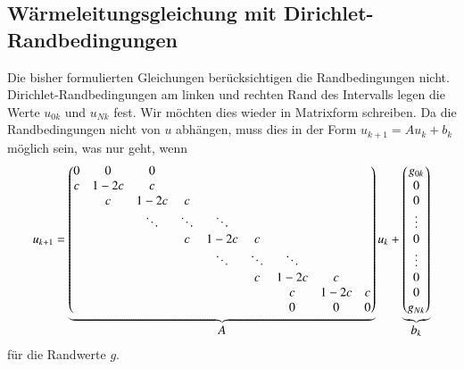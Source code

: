 \subsection{Wärmeleitungsgleichung mit Dirichlet-Randbedingungen
\label{buch:pde:subsection:waerme:dirichlet}}
Die bisher formulierten Gleichungen berücksichtigen die
Randbedingungen nicht.
Dirichlet-Rand\-bedingungen am linken und rechten Rand des Intervalls
legen die Werte $u_{0k}$ und $u_{Nk}$ fest.
Wir möchten dies wieder in Matrixform schreiben.
Da die Randbedingungen nicht von $u$ abhängen, muss dies in der Form
$u_{k+1}=Au_k + b_k$ möglich sein, was nur geht, wenn
\begin{equation}
u_{k+1}
=
\underbrace{
\begin{pmatrix}
 0  &   0  &  0   &      &      &      &      &      &      \\
 c  & 1-2c &  c   &      &      &      &      &      &      \\
    &  c   & 1-2c &  c   &      &      &      &      &      \\
    &      &\ddots&\ddots&\ddots&      &      &      &      \\
    &      &      &  c   & 1-2c &  c   &      &      &      \\
    &      &      &      &\ddots&\ddots&\ddots&      &      \\
    &      &      &      &      &  c   & 1-2c &  c   &      \\
    &      &      &      &      &      &  c   & 1-2c &  c   \\
    &      &      &      &      &      &  0   &  0   &  0   
\end{pmatrix}}_{\displaystyle A\mathstrut}
u_k
+
\underbrace{
\begin{pmatrix}
g_{0k}\\
0     \\
0     \\
\vdots\\
0     \\
\vdots\\
0     \\
0     \\
g_{Nk}
\end{pmatrix}}_{\displaystyle b_k\mathstrut}
\end{equation}
für die Randwerte $g$.

